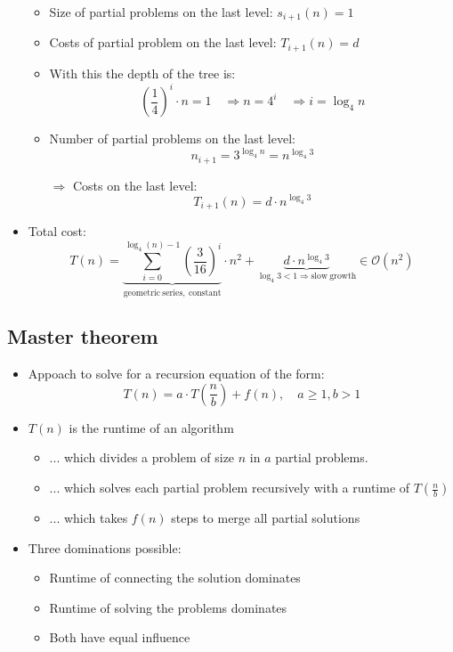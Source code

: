 \documentclass[12pt, a4paper]{scrartcl}
\newcommand{\bigO}{\mathcal{O}}
\renewcommand{\implies}{\Rightarrow}
\begin{document}
\begin{itemize}
  \begin{itemize}
  \item Size of partial problems on the last level: $s_{i+1}(n)=1$
  \item Costs of partial problem on the last level: $T_{i+1}(n)=d$
  \item With this the depth of the tree is:
    \begin{equation*}
      \left( \frac{1}{4} \right)^i\cdot n=1\quad\implies n=4^i\quad\implies i=\log_4 n
    \end{equation*}
  \item Number of partial problems on the last level:
    \begin{equation*}
      n_{i+1}=3^{\log_4 n}=n^{\log_4 3}
    \end{equation*}
  \item[$\implies$] Costs on the last level:
    \begin{equation*}
      T_{i+1}(n)=d\cdot n^{\log_4 3}
    \end{equation*}
  \end{itemize}
\item Total cost:
  \begin{equation*}
    T(n)=\underbrace{\sum^{\log_4(n)-1}_{i=0}\left( \frac{3}{16} \right)^i}_{\mathrm{geometric\ series,\ constant}}\cdot n^2 +
    \underbrace{d\cdot n^{\log_4 3}}_{\log_4 3<1\implies\mathrm{slow\ growth}}\in\bigO(n^2)
  \end{equation*}
\end{itemize}

\subsection{Master theorem}
\label{sec:master_theorem}
\begin{itemize}
\item Appoach to solve for a recursion equation of the form:
  \begin{equation}
    \label{eq:master_theorem_basic}
    \boxed{T(n)=a\cdot T\left( \frac{n}{b} \right)+f(n),\quad a\ge 1, b> 1}
  \end{equation}
\item $T(n)$ is the runtime of an algorithm
  \begin{itemize}
  \item ... which divides a problem of size $n$ in $a$ partial problems.
  \item ... which solves each partial problem recursively with a runtime of $T\left( \frac{n}{b} \right)$
  \item ... which takes $f(n)$ steps to merge all partial solutions
  \end{itemize}
\item Three dominations possible:
  \begin{itemize}
  \item Runtime of connecting the solution dominates
  \item Runtime of solving the problems dominates
  \item Both have equal influence
  \end{itemize}
\end{itemize}
\end{document}
